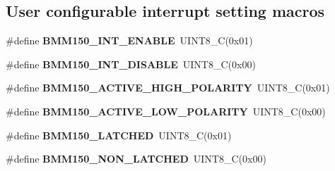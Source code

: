 \subsection*{User configurable interrupt setting macros}
\begin{DoxyCompactItemize}
\item 
\mbox{\label{group___b_m_m150_gae70c03de48f609fd7c0ce910ccc367c4}} 
\#define {\bfseries B\+M\+M150\+\_\+\+I\+N\+T\+\_\+\+E\+N\+A\+B\+LE}~U\+I\+N\+T8\+\_\+C(0x01)
\item 
\mbox{\label{group___b_m_m150_gafb571f959248cb5c9c64a7dcf843fe27}} 
\#define {\bfseries B\+M\+M150\+\_\+\+I\+N\+T\+\_\+\+D\+I\+S\+A\+B\+LE}~U\+I\+N\+T8\+\_\+C(0x00)
\item 
\mbox{\label{group___b_m_m150_ga486c396fdf712cc623b9e9d35dd3f127}} 
\#define {\bfseries B\+M\+M150\+\_\+\+A\+C\+T\+I\+V\+E\+\_\+\+H\+I\+G\+H\+\_\+\+P\+O\+L\+A\+R\+I\+TY}~U\+I\+N\+T8\+\_\+C(0x01)
\item 
\mbox{\label{group___b_m_m150_ga2987930ff7b045e01a53bdf6eecbe253}} 
\#define {\bfseries B\+M\+M150\+\_\+\+A\+C\+T\+I\+V\+E\+\_\+\+L\+O\+W\+\_\+\+P\+O\+L\+A\+R\+I\+TY}~U\+I\+N\+T8\+\_\+C(0x00)
\item 
\mbox{\label{group___b_m_m150_ga74a1dcf326f7e6a2117e6901b2a0025f}} 
\#define {\bfseries B\+M\+M150\+\_\+\+L\+A\+T\+C\+H\+ED}~U\+I\+N\+T8\+\_\+C(0x01)
\item 
\mbox{\label{group___b_m_m150_gadd32543d7b560e6e0c457ce5de5a5c86}} 
\#define {\bfseries B\+M\+M150\+\_\+\+N\+O\+N\+\_\+\+L\+A\+T\+C\+H\+ED}~U\+I\+N\+T8\+\_\+C(0x00)
\end{DoxyCompactItemize}
